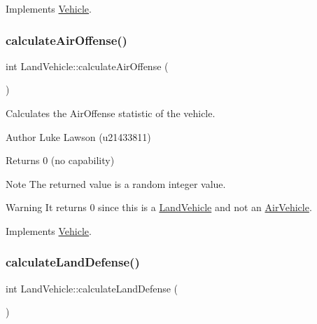 Implements \mbox{\hyperlink{class_vehicle_ae87cbec24f436b431fbed096024c41c9}{Vehicle}}.

\mbox{\label{class_land_vehicle_a2453f77778b1c36b2b2fbeb19d06776e}} 
\subsubsection{\texorpdfstring{calculateAirOffense()}{calculateAirOffense()}}
{\footnotesize\ttfamily int Land\+Vehicle\+::calculate\+Air\+Offense (\begin{DoxyParamCaption}{ }\end{DoxyParamCaption})\hspace{0.3cm}{\ttfamily [virtual]}}



Calculates the Air\+Offense statistic of the vehicle. 

\begin{DoxyAuthor}{Author}
Luke Lawson (u21433811) 
\end{DoxyAuthor}
\begin{DoxyReturn}{Returns}
0 (no capability) 
\end{DoxyReturn}
\begin{DoxyNote}{Note}
The returned value is a random integer value. 
\end{DoxyNote}
\begin{DoxyWarning}{Warning}
It returns 0 since this is a \mbox{\hyperlink{class_land_vehicle}{Land\+Vehicle}} and not an \mbox{\hyperlink{class_air_vehicle}{Air\+Vehicle}}. 
\end{DoxyWarning}


Implements \mbox{\hyperlink{class_vehicle_a0a6c6ed9d25c66415f83191894b11499}{Vehicle}}.

\mbox{\label{class_land_vehicle_aa294605ab1e7a30d2b62b51aa3957713}} 
\subsubsection{\texorpdfstring{calculateLandDefense()}{calculateLandDefense()}}
{\footnotesize\ttfamily int Land\+Vehicle\+::calculate\+Land\+Defense (\begin{DoxyParamCaption}{ }\end{DoxyParamCaption})\hspace{0.3cm}{\ttfamily [virtual]}}



